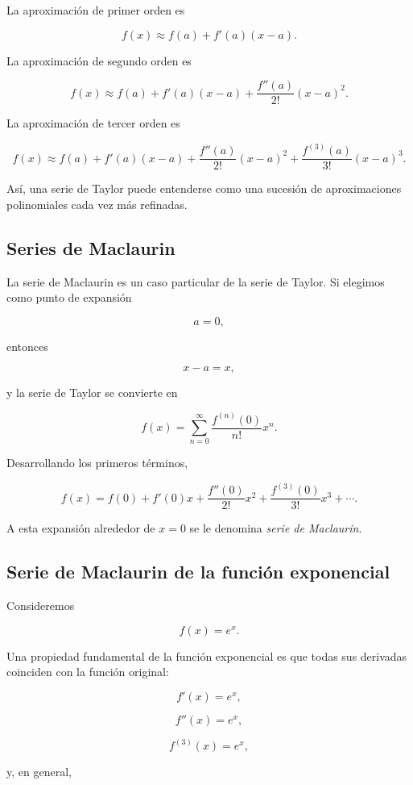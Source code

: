 \documentclass[12pt]{article}
\begin{document}
La aproximación de primer orden es

\[f(x)\approx f(a)+f'(a)(x-a).\]

La aproximación de segundo orden es

\[f(x)\approx f(a)+f'(a)(x-a)+\frac{f''(a)}{2!}(x-a)^2.\]

La aproximación de tercer orden es

\[f(x)\approx f(a)+f'(a)(x-a)+\frac{f''(a)}{2!}(x-a)^2+\frac{f^{(3)}(a)}{3!}(x-a)^3.\]

Así, una serie de Taylor puede entenderse como una sucesión de aproximaciones polinomiales cada vez más refinadas.

\subsection{Series de Maclaurin}

La serie de Maclaurin es un caso particular de la serie de Taylor. Si elegimos como punto de expansión

\[a=0,\]

entonces

\[x-a=x,\]

y la serie de Taylor se convierte en

\[\boxed{f(x)=\sum_{n=0}^{\infty}\frac{f^{(n)}(0)}{n!}x^n.}\]

Desarrollando los primeros términos,

\[\boxed{f(x)=f(0)+f'(0)x+\frac{f''(0)}{2!}x^2+\frac{f^{(3)}(0)}{3!}x^3+\cdots.}\]

A esta expansión alrededor de \(x=0\) se le denomina \emph{serie de Maclaurin}.
\subsection*{Serie de Maclaurin de la función exponencial}
Consideremos

\[f(x)=e^x.\]

Una propiedad fundamental de la función exponencial es que todas sus
derivadas coinciden con la función original:

\[f'(x)=e^x,\]

\[f''(x)=e^x,\]

\[f^{(3)}(x)=e^x,\]

y, en general,
\end{document}
